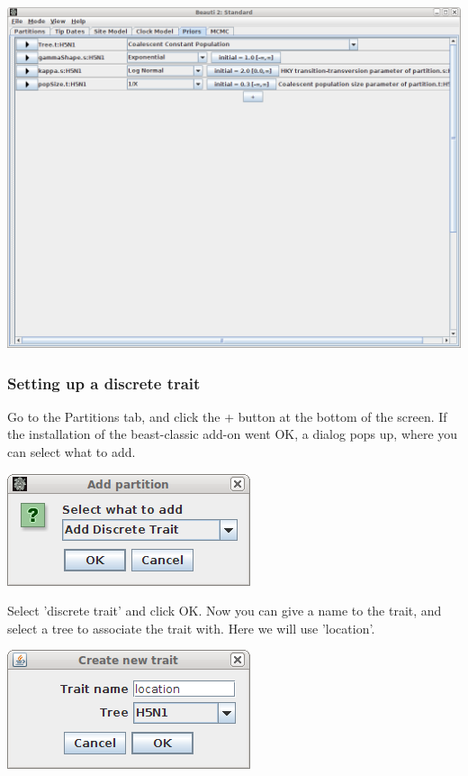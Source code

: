 \documentclass{article}
\begin{document}
\includegraphics[scale=0.4]{figures/BEAUti_priors.png}


\subsubsection*{Setting up a discrete trait}

Go to the Partitions tab, and click the + button at the bottom of the screen.
If the installation of the beast-classic add-on went OK, a dialog pops up, where you can select what to add.

\includegraphics[scale=0.4]{figures/BEAUti_trait.png}

Select 'discrete trait' and click OK. Now you can give a name to the trait, and select a tree to associate the trait with. 
Here we will use 'location'.

\includegraphics[scale=0.4]{figures/BEAUti_trait2.png}
\end{document}
